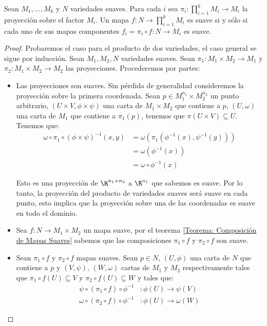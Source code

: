 \begin{theorem}\label{Teorema: Mapa a Producto de Variedades Suaves}
	Sean $M_1,\dots,M_k$ y $N$ variedades suaves. Para cada $i$ sea $\pi_i: \prod_{i=1}^{k} M_i \to M_i$ la proyección sobre el factor $M_i$. Un mapa $f: N \to \prod_{i=1}^{k} M_i$ es suave si y sólo si cada uno de sus mapas componentes $f_i = \pi_i \circ f: N \to M_i$ es suave.
\end{theorem}

\begin{proof}
	Probaremos el caso para el producto de dos variedades, el caso general se sigue por inducción. Sean $M_1, M_2, N$ variedades suaves. Sean $\pi_1: M_1 \times M_2 \to M_1$ y $\pi_2: M_1 \times M_2 \to M_2$ las proyecciones. Procederemos por partes:

	\begin{itemize}
		\item Las proyecciones son suaves. Sin pérdida de generalidad consideremos la proyección sobre la primera coordenada.
		      Sean $p \in M_1^{n_1} \times M_2^{n_2}$ un punto arbitrario, $(U \times V,\phi \times \psi)$ una carta de $M_1 \times M_2$ que contiene a $p$, $(U, \omega)$ una carta de $M_1$ que contiene a $\pi_1(p)$, tenemos que $\pi(U \times V) \subseteq U$. Tenemos que:
		      \begin{align*}
			      \omega \circ \pi_1 \circ (\phi \times \psi)^{-1}(x,y) & =  \omega(\pi_1 (\phi^{-1}(x), \psi^{-1}(y))) \\
			                                                            & = \omega(\phi^{-1}(x))                        \\
			                                                            & = \omega \circ \phi^{-1}(x)
		      \end{align*}

		      Esto es una proyección de $\R^{n_1 + n_2}$ a $\R^{n_1}$ que sabemos es suave. Por lo tanto, la proyección del producto de variedades suaves será suave en cada punto, esto implica que la proyección sobre una de las coordenadas es suave en todo el dominio.

		\item Sea $f: N \to M_1 \times M_2$ un mapa suave, por el teorema \ref{Teorema: Composición de Mapas Suaves} sabemos que las composiciones $\pi_1 \circ f$ y $\pi_2 \circ f$ son suave.

		\item Sean $\pi_1 \circ f$ y $\pi_2 \circ f$ mapas suaves. Sean $p \in N$, $(U,\phi)$ una carta de $N$ que contiene a $p$ y $(V,\psi)$, $(W,\omega)$ cartas de $M_1$ y $M_2$ respectivamente tales que $\pi_1 \circ f (U) \subseteq V$ y $\pi_2 \circ f(U) \subseteq W$ y tales que:
		      \begin{align*}
			      \psi \circ (\pi_1 \circ f) \circ \phi^{-1}   & : \phi(U) \to \psi(V)   \\
			      \omega \circ (\pi_2 \circ f) \circ \phi^{-1} & : \phi(U) \to \omega(W)
		      \end{align*}


\end{itemize}
\end{proof}
